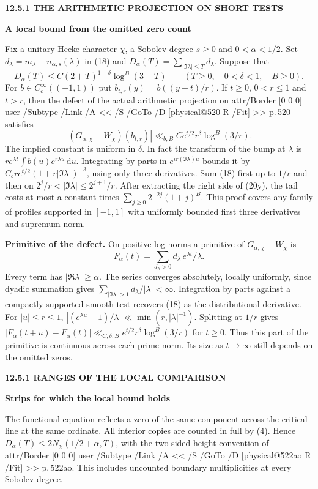 \documentclass[11pt,letterpaper]{article}
\makeatletter
\newcommand{\rightmarktext}{}
\newcommand{\printfolio}{}
\newcommand{\leaf}[4]{\clearpage\gdef\printfolio{#1}\gdef\rightmarktext{#2}%
  {\small\sffamily\bfseries\color{ink}#3\par}\vspace{3pt}%
  {\LARGE\bfseries #4\par}\vspace{5pt}}
\newcommand{\point}[1]{\par\smallskip\textbf{#1.}\enspace\ignorespaces}
\newcommand{\dd}{\,\mathrm d}
\newcommand{\MusicPDFPageRef}[1]{\pdfpageref\csname physical@#1\endcsname\space\space 0 R}
\newcommand{\pagelink}[2]{\leavevmode\pdfstartlink attr{/Border [0 0 0]} user{%
  /Subtype /Link /A << /S /GoTo /D [\MusicPDFPageRef{#1} /Fit] >>}%
  {\color{ink}#2}\pdfendlink}
\newcommand{\pg}[1]{\pagelink{#1}{p.\,#1}}
\makeatother
\begin{document}
\leaf{520s}{Localization of the strip defect}{12.5.1 \quad THE ARITHMETIC PROJECTION ON SHORT TESTS}{A local bound from the omitted zero count}
Fix a unitary Hecke character $\chi$, a Sobolev degree $s\ge0$ and
$0<\alpha<1/2$. Set $d_\lambda=m_\lambda-n_{\alpha,s}(\lambda)$ in (18)
and $D_\alpha(T)=\sum_{|\Im\lambda|\le T}d_\lambda$. Suppose that
\[
 D_\alpha(T)\le C(2+T)^{1-\delta}\log^B(3+T)
      \qquad(T\ge0,\quad 0<\delta<1,\quad B\ge0).
\]
For $b\in C_c^\infty((-1,1))$ put $b_{t,r}(y)=b((y-t)/r)$.
If $t\ge0$, $0<r\le1$ and $t>r$, then the defect of the actual
arithmetic projection on \pg{520} satisfies
\[
 |(G_{\alpha,\chi}-W_\chi)(b_{t,r})|
   \ll_{b,B} C e^{t/2}r^\delta\log^B(3/r).
 \tag{20y}
\]
The implied constant is uniform in $\delta$. In fact the transform of
the bump at $\lambda$ is $re^{\lambda t}\int b(u)e^{r\lambda u}\dd u$.
Integrating by parts in $e^{ir(\Im\lambda)u}$ bounds it by
$C_b r e^{t/2}(1+r|\Im\lambda|)^{-3}$, using only three derivatives.
Sum (18) first up to $1/r$ and then on $2^j/r<|\Im\lambda|\le2^{j+1}/r$.
After extracting the right side of (20y), the tail costs at most a
constant times $\sum_{j\ge0}2^{-2j}(1+j)^B$. This proof covers any
family of profiles supported in $[-1,1]$ with uniformly bounded first
three derivatives and supremum norm.

\point{Primitive of the defect}
On positive log norms a primitive of $G_{\alpha,\chi}-W_\chi$ is
\[
                  F_\alpha(t)=\sum_{d_\lambda>0}
                           d_\lambda\,e^{\lambda t}/\lambda .
\]
Every term has $|\Re\lambda|\ge\alpha$. The series converges absolutely,
locally uniformly, since dyadic summation gives
$\sum_{|\Im\lambda|>1} d_\lambda/|\lambda|<\infty$.
Integration by parts against a compactly supported smooth test recovers
(18) as the distributional derivative. For $|u|\le r\le1$,
$|(e^{\lambda u}-1)/\lambda|\ll\min(r,|\lambda|^{-1})$.
Splitting at $1/r$ gives
$|F_\alpha(t+u)-F_\alpha(t)|\ll_{C,\delta,B} e^{t/2}r^\delta\log^B(3/r)$
for $t\ge0$. Thus this part of the primitive is continuous across each
prime norm. Its size as $t\to\infty$ still depends on the omitted zeros.

\leaf{520t}{Zero densities and strip widths}{12.5.1 \quad RANGES OF THE LOCAL COMPARISON}{Strips for which the local bound holds}
The functional equation reflects a zero of the same component across
the critical line at the same ordinate. All interior copies are counted
in full by (4). Hence $D_\alpha(T)\le2N_\chi(1/2+\alpha,T)$, with the
two-sided height convention of \pg{522ao}. This includes uncounted
boundary multiplicities at every Sobolev degree.
\end{document}
